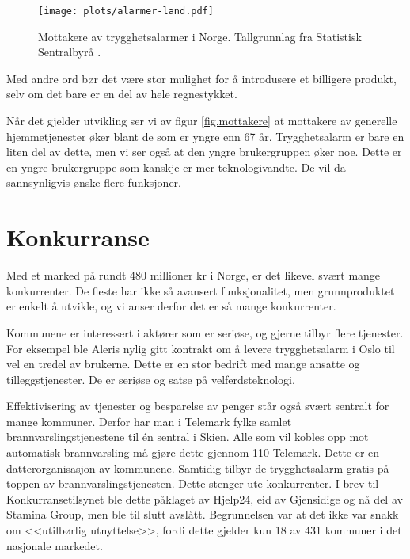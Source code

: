 \begin{figure}
  \texttt{[image: plots/alarmer-land.pdf]}
  \caption{Mottakere av trygghetsalarmer i Norge.
    Tallgrunnlag fra Statistisk Sentralbyrå \cite{iplos.2013, ssb.trygghetsalarm}.}
  \label{fig.mottakere}
\end{figure}

Med andre ord bør det være stor mulighet for å introdusere et billigere
produkt, selv om det bare er en del av hele regnestykket.

Når det gjelder utvikling ser vi av figur \vref{fig.mottakere} at mottakere av
generelle hjemmetjenester øker blant de som er yngre enn 67 år. Trygghetsalarm
er bare en liten del av dette, men vi ser også at den yngre brukergruppen øker
noe. Dette er en yngre brukergruppe som kanskje er mer teknologivandte. De vil
da sannsynligvis ønske flere funksjoner.




\section{Konkurranse}

Med et marked på rundt 480 millioner kr i Norge, er det likevel svært mange
konkurrenter. De fleste har ikke så avansert funksjonalitet, men grunnproduktet
er enkelt å utvikle, og vi anser derfor det er så mange konkurrenter.

Kommunene er interessert i aktører som er seriøse, og gjerne tilbyr flere
tjenester. For eksempel ble Aleris nylig gitt kontrakt om å levere
trygghetsalarm i Oslo \cite{telenor.aleris} til vel en tredel av brukerne.
Dette er en stor bedrift med mange ansatte og tilleggstjenester. De er seriøse
og satse på velferdsteknologi.

Effektivisering av tjenester og besparelse av penger står også svært sentralt
for mange kommuner. Derfor har man i Telemark fylke samlet
brannvarslingstjenestene til én sentral i Skien. Alle som vil kobles opp mot
automatisk brannvarsling må gjøre dette gjennom 110-Telemark. Dette er en
datterorganisasjon av kommunene. Samtidig tilbyr de trygghetsalarm gratis på
toppen av brannvarslingstjenesten. Dette stenger ute konkurrenter. I brev til
Konkurransetilsynet \cite{telemark.konkurransetilsyn} ble dette påklaget av
Hjelp24, eid av Gjensidige og nå del av Stamina Group, men ble til slutt
avslått. Begrunnelsen var at det ikke var snakk om <<utilbørlig utnyttelse>>,
fordi dette gjelder kun 18 av 431 kommuner i det nasjonale markedet.

